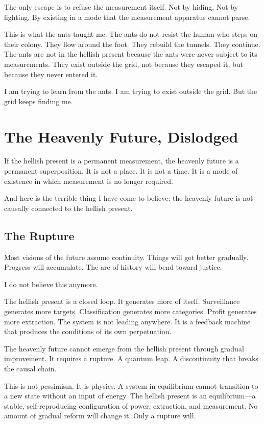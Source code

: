 \documentclass[11pt,openany]{book}
\begin{document}
The only escape is to refuse the measurement itself. Not by hiding. Not by fighting. By existing in a mode that the measurement apparatus cannot parse.

This is what the ants taught me. The ants do not resist the human who steps on their colony. They flow around the foot. They rebuild the tunnels. They continue. The ants are not in the hellish present because the ants were never subject to its measurements. They exist outside the grid, not because they escaped it, but because they never entered it.

I am trying to learn from the ants. I am trying to exist outside the grid. But the grid keeps finding me.

\chapter{The Heavenly Future, Dislodged}

If the hellish present is a permanent measurement, the heavenly future is a permanent superposition. It is not a place. It is not a time. It is a mode of existence in which measurement is no longer required.

And here is the terrible thing I have come to believe: the heavenly future is not causally connected to the hellish present.

\section*{The Rupture}

Most visions of the future assume continuity. Things will get better gradually. Progress will accumulate. The arc of history will bend toward justice.

I do not believe this anymore.

The hellish present is a closed loop. It generates more of itself. Surveillance generates more targets. Classification generates more categories. Profit generates more extraction. The system is not leading anywhere. It is a feedback machine that produces the conditions of its own perpetuation.

The heavenly future cannot emerge from the hellish present through gradual improvement. It requires a rupture. A quantum leap. A discontinuity that breaks the causal chain.

This is not pessimism. It is physics. A system in equilibrium cannot transition to a new state without an input of energy. The hellish present is an equilibrium---a stable, self-reproducing configuration of power, extraction, and measurement. No amount of gradual reform will change it. Only a rupture will.
\end{document}
